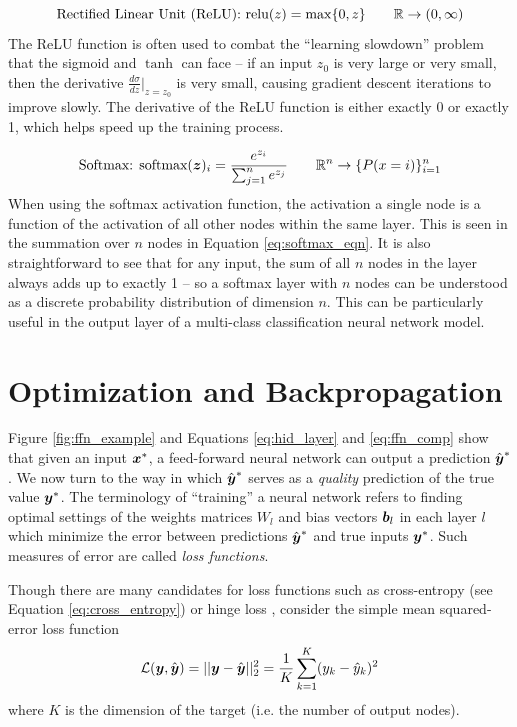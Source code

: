\begin{equation}
  \text{Rectified Linear Unit (ReLU): } \text{relu}(z) = \max\{0, z\} \quad \quad \mathbb{R} \to (0,\infty)
  \label{eq:relu_eqn}
\end{equation}
The ReLU function is often used to combat the ``learning slowdown'' problem that the sigmoid and $\tanh$ can face -- if an input $z_0$ is very large or very small, then the derivative $\frac{d\sigma}{dz} \Big|_{z=z_0}$ is very small, causing gradient descent iterations to improve slowly. The derivative of the ReLU function is either exactly 0 or exactly 1, which helps speed up the training process.

\begin{equation}
  \text{Softmax: } \text{softmax}(\boldsymbol{z})_i = \frac{e^{z_i}}{\sum_{j=1}^n e^{z_j}} \quad \quad \mathbb{R}^n \to \{P(x=i)\}_{i=1}^n
  \label{eq:softmax_eqn}
\end{equation}
When using the softmax activation function, the activation a single node is a function of the activation of all other nodes within the same layer. This is seen in the summation over $n$ nodes in Equation \ref{eq:softmax_eqn}. It is also straightforward to see that for any input, the sum of all $n$ nodes in the layer always adds up to exactly 1 -- so a softmax layer with $n$ nodes can be understood as a discrete probability distribution of dimension $n$. This can be particularly useful in the output layer of a multi-class classification neural network model.


\section{Optimization and Backpropagation}\label{apdx:backprop}
Figure \ref{fig:ffn_example} and Equations \ref{eq:hid_layer} and \ref{eq:ffn_comp} show that given an input $\boldsymbol{x}^*$, a feed-forward neural network can output a prediction $\hat{\boldsymbol{y}}^*$. We now turn to the way in which $\hat{\boldsymbol{y}}^*$ serves as a \textit{quality} prediction of the true value $\boldsymbol{y}^*$. The terminology of ``training'' a neural network refers to finding optimal settings of the weights matrices $W_l$ and bias vectors $\boldsymbol{b}_l$ in each layer $l$ which minimize the error between predictions $\hat{\boldsymbol{y}}^*$ and true inputs $\boldsymbol{y}^*$. Such measures of error are called \textit{loss functions}.

Though there are many candidates for loss functions such as cross-entropy (see Equation \ref{eq:cross_entropy}) or hinge loss \cite{gentile1998}, consider the simple mean squared-error loss function
\begin{equation}
  \mathcal{L}(\boldsymbol{y}, \hat{\boldsymbol{y}}) = ||\boldsymbol{y} - \hat{\boldsymbol{y}}||_2^2 = \frac{1}{K} \sum_{k=1}^K (y_k - \hat{y}_k)^2
  \label{eq:mse_loss}
\end{equation}
where $K$ is the dimension of the target (i.e. the number of output nodes).

